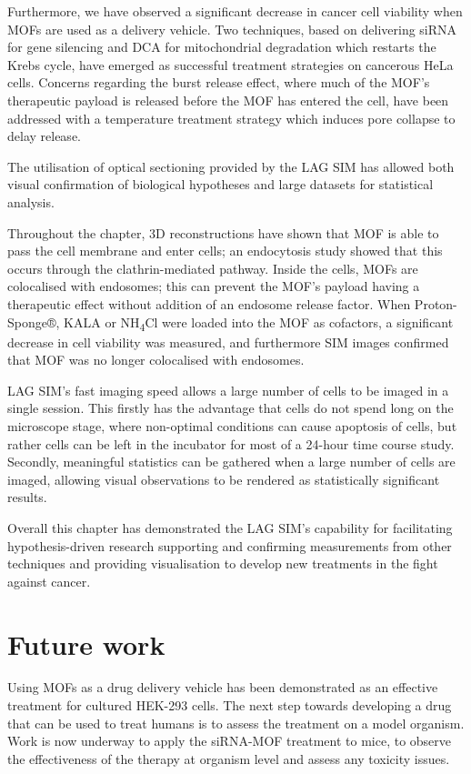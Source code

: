 Furthermore, we have observed a significant decrease in cancer cell viability when MOFs are used as a delivery vehicle.
Two techniques, based on delivering siRNA for gene silencing and DCA for mitochondrial degradation which restarts the Krebs cycle, have emerged as successful treatment strategies on cancerous HeLa cells.
Concerns regarding the burst release effect, where much of the MOF's therapeutic payload is released before the MOF has entered the cell, have been addressed with a temperature treatment strategy which induces pore collapse to delay release.

The utilisation of optical sectioning provided by the LAG SIM has allowed both visual confirmation of biological hypotheses and large datasets for statistical analysis.

Throughout the chapter, 3D reconstructions have shown that MOF is able to pass the cell membrane and enter cells; an endocytosis study showed that this occurs through the clathrin-mediated pathway.
Inside the cells, MOFs are colocalised with endosomes; this can prevent the MOF's payload having a therapeutic effect without addition of an endosome release factor.
When Proton-Sponge®, KALA or NH\textsubscript{4}Cl were loaded into the MOF as cofactors, a significant decrease in cell viability was measured, and furthermore SIM images confirmed that MOF was no longer colocalised with endosomes.

LAG SIM's fast imaging speed allows a large number of cells to be imaged in a single session.
This firstly has the advantage that cells do not spend long on the microscope stage, where non-optimal conditions can cause apoptosis of cells, but rather cells can be left in the incubator for most of a 24-hour time course study.
Secondly, meaningful statistics can be gathered when a large number of cells are imaged, allowing visual observations to be rendered as statistically significant results.

Overall this chapter has demonstrated the LAG SIM's capability for facilitating hypothesis-driven research supporting and confirming measurements from other techniques and providing visualisation to develop new treatments in the fight against cancer.

\section{Future work}
Using MOFs as a drug delivery vehicle has been demonstrated as an effective treatment for cultured HEK-293 cells.
The next step towards developing a drug that can be used to treat humans is to assess the treatment on a model organism.
Work is now underway to apply the siRNA-MOF treatment to mice, to observe the effectiveness of the therapy at organism level and assess any toxicity issues.

